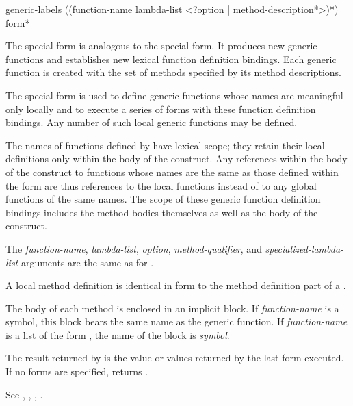 \begin{defspec}
generic-labels ({(function-name lambda-list
                <?option | {method-description}*>)}*)
               {\,form}*

The  special form is analogous to the
 special form.  It produces new generic functions and
establishes new lexical function definition bindings.  Each generic
function is created with the set of methods specified by its method
descriptions.

The special form  is used to define generic functions
whose names are meaningful only locally and to execute a series of
forms with these function definition bindings.  Any number of
such  local generic functions may be defined.  

The names of functions defined by  have lexical
scope; they retain their local definitions only within the body of the
 construct.  Any references within the body of the
 construct to functions whose names are the same
as those defined within the  form are thus
references to the local functions instead of to any global functions
of the same names.  The scope of these generic function definition bindings
includes the method bodies themselves as well as the body of the 
 construct.




The {\it function-name\/}, {\it lambda-list\/}, {\it option}, {\it
method-qualifier}, and {\it specialized-lambda-list\/} arguments are
the same as for .

A  local method definition is identical in form to the
method definition part of a .

The body of each method is enclosed in an implicit block.  If {\it
function-name\/} is a symbol, this block bears the same name as
the generic function.  If {\it function-name\/} is a list of the
form , the name of the block is {\it
symbol}.  


The result returned by  is the value or values
returned by the last form executed.  If no forms are specified, 
 returns .

See , , , .
\end{defspec}


